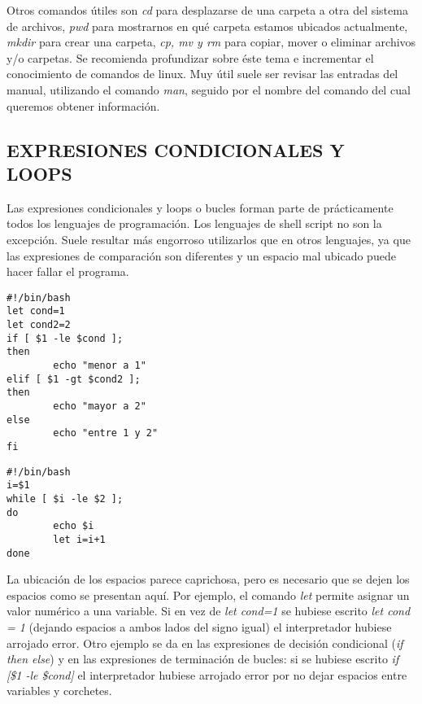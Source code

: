 Otros comandos útiles son \textit{cd} para desplazarse de una carpeta a otra del sistema de archivos, \textit{pwd} para mostrarnos
en qué carpeta estamos ubicados actualmente, \textit{mkdir} para crear una carpeta, \textit{cp, mv y rm} para copiar, mover o eliminar
archivos y/o carpetas. Se recomienda profundizar sobre éste tema e incrementar el conocimiento de comandos de linux. Muy útil suele ser revisar
las entradas del manual, utilizando el comando \textit{man}, seguido por el nombre del comando del cual queremos obtener información.

\subsection{EXPRESIONES CONDICIONALES Y LOOPS}

Las expresiones condicionales y loops o bucles forman parte de prácticamente todos los lenguajes de programación. Los lenguajes de shell script
no son la excepción. Suele resultar más engorroso utilizarlos que en otros lenguajes, ya que las expresiones de comparación son diferentes
y un espacio mal ubicado puede hacer fallar el programa.
\begin{lstlisting}
#!/bin/bash
let cond=1
let cond2=2
if [ $1 -le $cond ];
then
        echo "menor a 1"
elif [ $1 -gt $cond2 ];
then
        echo "mayor a 2"
else
        echo "entre 1 y 2"
fi
\end{lstlisting}
\begin{lstlisting}
#!/bin/bash
i=$1
while [ $i -le $2 ];
do
        echo $i
        let i=i+1
done
\end{lstlisting}

La ubicación de los espacios parece caprichosa, pero es necesario que se dejen los espacios como se presentan aquí. Por ejemplo, el comando
\textit{let}
permite asignar un valor numérico a una variable. Si en vez de \textit{let cond=1} se hubiese escrito \textit{let cond = 1} (dejando espacios a ambos lados del signo igual) el interpretador
hubiese arrojado error. Otro ejemplo se da en las expresiones de decisión condicional (\textit{if then else}) y  en las expresiones de terminación
de bucles: si se hubiese escrito \textit{if [\$1 -le \$cond]} el interpretador hubiese arrojado error por no dejar espacios entre variables y
corchetes.

